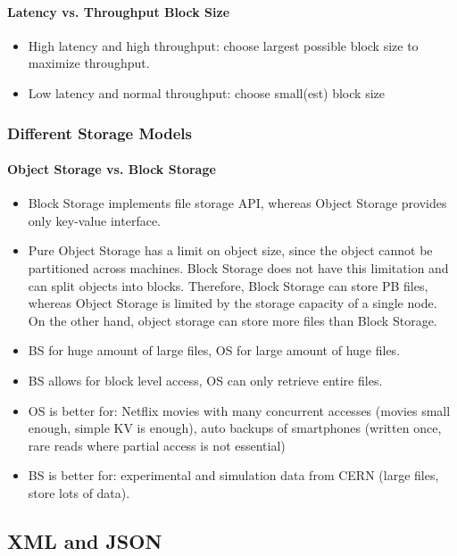 \paragraph{Latency vs. Throughput Block Size}
\begin{itemize}
    \item High latency and high throughput: choose largest possible block size to maximize throughput.
    \item Low latency and normal throughput: choose small(est) block size
\end{itemize}

\subsubsection{Different Storage Models}

\paragraph{Object Storage vs. Block Storage}
\begin{itemize}
    \item Block Storage implements file storage API, whereas Object Storage provides only key-value interface.
    \item Pure Object Storage has a limit on object size, since the object cannot be partitioned across machines. Block Storage does not have this limitation and can split objects into blocks. Therefore, Block Storage can store PB files, whereas Object Storage is limited by the storage capacity of a single node. On the other hand, object storage can store more files than Block Storage.
    \item BS for huge amount of large files, OS for large amount of huge files.
    \item BS allows for block level access, OS can only retrieve entire files.
    \item OS is better for: Netflix movies with many concurrent accesses (movies small enough, simple KV is enough), auto backups of smartphones (written once, rare reads where partial access is not essential)
    \item BS is better for: experimental and simulation data from CERN (large files, store lots of data).
\end{itemize}



\subsection{XML and JSON}

